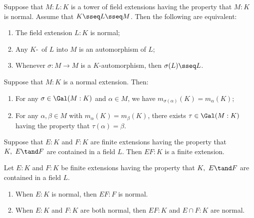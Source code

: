 \documentclass{article}
\begin{document}
  \begin{ttheorem}
    Suppose that $M:L:K$ is a tower of field extensions having the property that $M:K$ is normal. Assume that $K\sseq L\sseq M$. Then the following are equivalent:
    \begin{enumerate}[label=(\roman*)]
      \item The field extension $L:K$ is normal;
      \item Any $K$-\homo~of $L$ into $M$ is an automorphism of $L$;
      \item Whenever $\sigma:M\to M$ is a $K$-automorphism, then $\sigma(L)\sseq L$.
    \end{enumerate}
  \end{ttheorem}

  \begin{tproposition}
    Suppose that $M:K$ is a normal extension. Then:
    \begin{enumerate}[label=(\alph*)]
      \item For any $\sigma\in\Gal(M:K)$ and $\alpha\in M$, we have $m_{\sigma(\alpha)}(K)=m_\alpha(K)$;
      \item For any $\alpha,\beta\in M$ with $m_\alpha(K)=m_\beta(K)$, there exists $\tau\in\Gal(M:K)$ having the property that $\tau(\alpha)=\beta$.
    \end{enumerate}
  \end{tproposition}

  \begin{tproposition}
    Suppose that $E:K$ and $F:K$ are finite extensions having the property that $K,\ E\tand F$ are contained in a field $L$. Then $EF:K$ is a finite extension.
  \end{tproposition}

  \begin{ttheorem}
    Let $E:K$ and $F:K$ be finite extensions having the property that $K,\ E\tand F$ are contained in a field $L$.
    \begin{enumerate}[label=(\alph*)]
      \item When $E:K$ is normal, then $EF:F$ is normal.
      \item When $E:K$ and $F:K$ are both normal, then $EF:K$ and $E\cap F:K$ are normal.
    \end{enumerate}
  \end{ttheorem}
\end{document}
